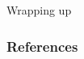\documentclass{hertieteaching}
\begin{document}
\begin{frame}{Wrapping up}


	
\end{frame}




%

%



\begin{frame}[allowframebreaks]
\frametitle{References}
\printbibliography	
\end{frame}
\end{document}
